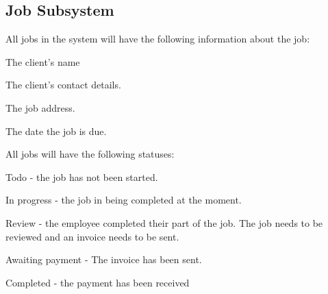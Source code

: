 \documentclass{article}
\begin{document}
	\subsection*{Job Subsystem}	
	\begin{list}{R.}{}
		\item All jobs in the system will have the following information about the job:
		\begin{list}{R.}{}
			\item The client's name 
			\item The client's contact details.
			\item The job address.
			\item The date the job is due.
		\end{list} 
		\item All jobs will have the following statuses:
		\begin{list}{R.}{}
			\item Todo - the job has not been started.
			\item In progress -  the job in being completed at the moment. 
			\item Review - the employee completed their part of the job. The job needs to be reviewed and an invoice needs to be sent.
			\item Awaiting payment - The invoice has been sent.
			\item Completed - the payment has been received
		\end{list}
	\end{list}
\end{document}
